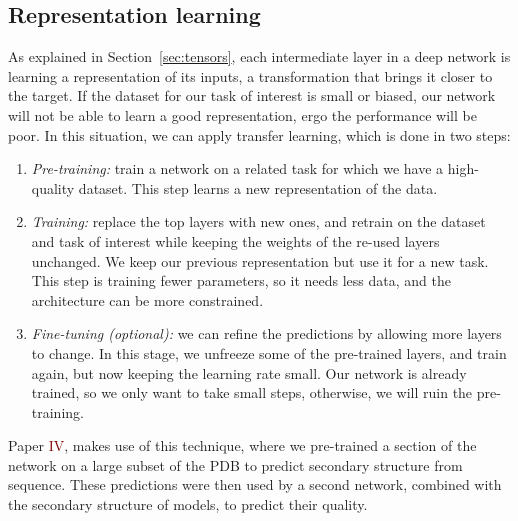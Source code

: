 \subsection{Representation learning}
As explained in Section~\ref{sec:tensors}, each intermediate layer in a deep network is learning a representation of its inputs, a transformation that brings it closer to the target.
If the dataset for our task of interest is small or biased, our network will not be able to learn a good representation, ergo the performance will be poor.
In this situation, we can apply transfer learning, which is done in two steps:
\begin{enumerate}
\item \emph{Pre-training:} train a network on a related task for which we have a high-quality dataset.
This step learns a new representation of the data.
\item \emph{Training:} replace the top layers with new ones, and retrain on the dataset and task of interest while keeping the weights of the re-used layers unchanged.
We keep our previous representation but use it for a new task.
This step is training fewer parameters, so it needs less data, and the architecture can be more constrained.
\item \emph{Fine-tuning (optional):} we can refine the predictions by allowing more layers to change.
In this stage, we unfreeze some of the pre-trained layers, and train again, but now keeping the learning rate small.
Our network is already trained, so we only want to take small steps, otherwise, we will ruin the pre-training.
\end{enumerate}

Paper \textcolor{Maroon}{IV}, makes use of this technique, where we pre-trained a section of the network on a large subset of the PDB to predict secondary structure from sequence.
These predictions were then used by a second network, combined with the secondary structure of models, to predict their quality.

